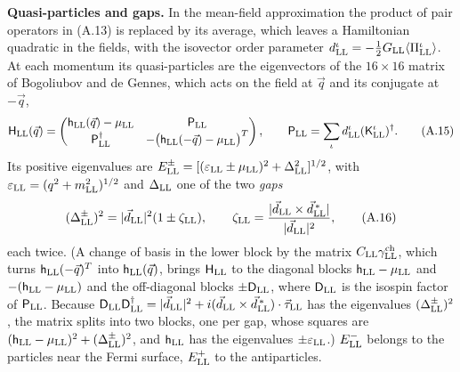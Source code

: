 \documentclass[
  10pt,
]{article}
\begin{document}
\textbf{Quasi-particles and gaps.} In the mean-field approximation the
product of pair operators in (A.13) is replaced by its average, which
leaves a Hamiltonian quadratic in the fields, with the isovector order
parameter
\(d^\iota_{\rm LL}=-\tfrac12G_{\rm LL}\langle\Pi^\iota_{\rm LL}\rangle\).
At each momentum its quasi-particles are the eigenvectors of the
\(16\times16\) matrix of Bogoliubov and de Gennes, which acts on the
field at \(\vec q\) and its conjugate at \(-\vec q\),
\[\mathsf H_{\rm LL}(\vec q)=\begin{pmatrix}\mathsf h_{\rm LL}(\vec q)-\mu_{\rm LL}&\mathsf P_{\rm LL}\\\mathsf P_{\rm LL}^\dagger&-\big(\mathsf h_{\rm LL}(-\vec q)-\mu_{\rm LL}\big)^T\end{pmatrix},\qquad\mathsf P_{\rm LL}=\sum_\iota d^\iota_{\rm LL}(\mathsf K^\iota_{\rm LL})^\dagger.\tag{A.15}\]
Its positive eigenvalues are
\(E^\pm_{\rm LL}=[(\varepsilon_{\rm LL}\pm\mu_{\rm LL})^2+\Delta_{\rm LL}^2]^{1/2}\),
with \(\varepsilon_{\rm LL}=(q^2+m_{\rm LL}^2)^{1/2}\) and
\(\Delta_{\rm LL}\) one of the two \emph{gaps}
\[(\Delta^\pm_{\rm LL})^2=|\vec d_{\rm LL}|^2(1\pm\zeta_{\rm LL}),\qquad\zeta_{\rm LL}=\frac{|\vec d_{\rm LL}\times\vec d^{\,*}_{\rm LL}|}{|\vec d_{\rm LL}|^2},\tag{A.16}\]
each twice. (A change of basis in the lower block by the matrix
\(C_{\rm LL}\gamma^{\rm ch}_{\rm LL}\), which turns
\(\mathsf h_{\rm LL}(-\vec q)^T\) into \(\mathsf h_{\rm LL}(\vec q)\),
brings \(\mathsf H_{\rm LL}\) to the diagonal blocks
\(\mathsf h_{\rm LL}-\mu_{\rm LL}\) and
\(-(\mathsf h_{\rm LL}-\mu_{\rm LL})\) and the off-diagonal blocks
\(\pm\mathsf D_{\rm LL}\), where \(\mathsf D_{\rm LL}\) is the isospin
factor of \(\mathsf P_{\rm LL}\). Because
\(\mathsf D_{\rm LL}\mathsf D_{\rm LL}^\dagger=|\vec d_{\rm LL}|^2+i(\vec d_{\rm LL}\times\vec d^{\,*}_{\rm LL})\cdot\vec\tau_{\rm LL}\)
has the eigenvalues \((\Delta^\pm_{\rm LL})^2\), the matrix splits into
two blocks, one per gap, whose squares are
\((\mathsf h_{\rm LL}-\mu_{\rm LL})^2+(\Delta^\pm_{\rm LL})^2\), and
\(\mathsf h_{\rm LL}\) has the eigenvalues \(\pm\varepsilon_{\rm LL}\).)
\(E^-_{\rm LL}\) belongs to the particles near the Fermi surface,
\(E^+_{\rm LL}\) to the antiparticles.
\end{document}
